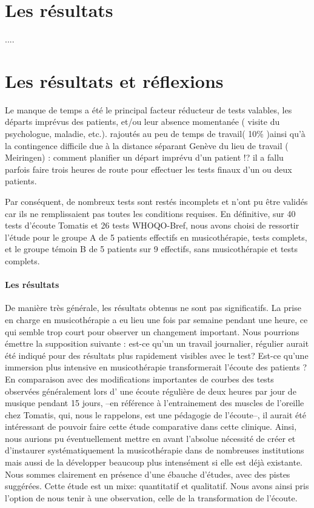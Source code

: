 \begin{enumerate}
 	
 	
 	\section{Les résultats}
 	
 	....
 	
 	
 	
 \section{Les résultats et réflexions}	
Le manque de temps a été le principal facteur  réducteur
de tests valables, les départs imprévus des patients, et/ou leur
absence momentanée ( visite du psychologue, maladie, etc.). rajoutés au peu de temps de travail( 10\% )ainsi qu'à la
contingence difficile due à la distance séparant Genève du lieu de travail ( Meiringen)
: comment planifier un départ imprévu d'un patient !? il a fallu parfois
faire trois heures de route pour effectuer les tests finaux d'un ou deux
patients.
  
Par conséquent,  de nombreux tests sont restés 
incomplets et n'ont pu
être validés car ils ne remplissaient pas toutes les conditions requises.  En définitive, sur 40 tests d'écoute Tomatis et 26 tests
WHOQO-Bref, nous avons choisi de ressortir l'étude pour le groupe A de
5 patients effectifs en musicothérapie, tests complets, et le groupe
témoin B de 5 patients sur 9 effectifs, sans musicothérapie et tests
complets. 
 

  
\paragraph{Les résultats}
  
  De manière très générale, les résultats obtenus ne
  sont pas significatifs.  La prise en charge en musicothérapie a eu lieu
  une fois par semaine pendant une heure, ce qui semble trop court pour observer un changement important. Nous pourrions émettre la supposition suivante :  est-ce qu'un un travail journalier, régulier aurait été indiqué pour des résultats plus rapidement visibles avec le test?
  Est-ce qu'une immersion plus intensive en musicothérapie transformerait l'écoute des patients ? 
   En comparaison avec des
  modifications importantes de courbes des tests observées généralement  lors d' une écoute
  régulière de deux heures par jour de musique pendant 15 jours, --en référence à l'entrainement des muscles de l'oreille chez Tomatis, qui, nous le rappelons, est une pédagogie de l'écoute--, il aurait été intéressant de pouvoir faire cette étude comparative dans cette clinique. Ainsi, nous aurions pu éventuellement mettre en avant  l'absolue nécessité de créer et d'instaurer systématiquement la musicothérapie dans de nombreuses institutions mais aussi  de la développer beaucoup plus intensément  si elle est déjà existante.
  Nous sommes clairement en présence d'une ébauche d'études, avec des pistes
  suggérées. 
  Cette étude est un mixe: quantitatif et qualitatif. Nous avons ainsi pris l'option de nous tenir à une
  observation, celle de la transformation de l'écoute.
  

\end{enumerate}
